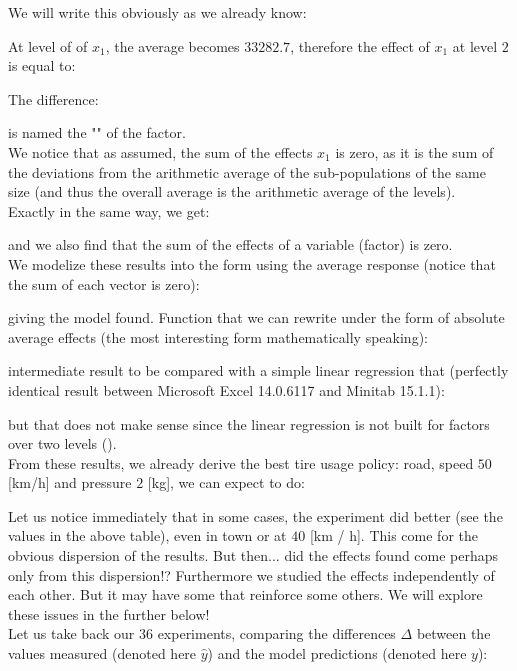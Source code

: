 	We will write this obviously as we already know:
	
	At level of of $x_1$, the average becomes $33282.7$, therefore the effect of $x_1$ at level $2$ is equal to:
	
	The difference:
	
	is named the "" of the factor.\\
	
	We notice that as assumed, the sum of the effects $x_1$ is zero, as it is the sum of the deviations from the arithmetic average of the sub-populations of the same size (and thus the overall average is the arithmetic average of the levels).\\
	
	Exactly in the same way, we get:
	
	and we also find that the sum of the effects of a variable (factor) is zero.\\

	We modelize these results into the form using the average response (notice that the sum of each vector is 
zero):
	
	giving the model found. Function that we can rewrite under the form of absolute average effects (the most interesting form mathematically speaking):
	
	intermediate result to be compared with a simple linear regression that (perfectly identical result between Microsoft Excel 14.0.6117 and Minitab 15.1.1):
	
	but that does not make sense since the linear regression is not built for factors over two levels ().\\

	From these results, we already derive the best tire usage policy: road, speed $50$ [km/h] and pressure $2$ [kg], we can expect to do:
	
	Let us notice immediately that in some cases, the experiment did better (see the values in the above table), even in town or at $40$ [km / h]. This come for the obvious dispersion of the results. But then... did the effects found come perhaps only from this dispersion!? Furthermore we studied the effects independently of each other. But it may have some that reinforce some others. We will explore these issues in the further below!\\
	
	Let us take back our $36$ experiments, comparing the differences $\Delta$ between the values measured (denoted here $\hat{y}$) and the model predictions (denoted here $y$):
	
